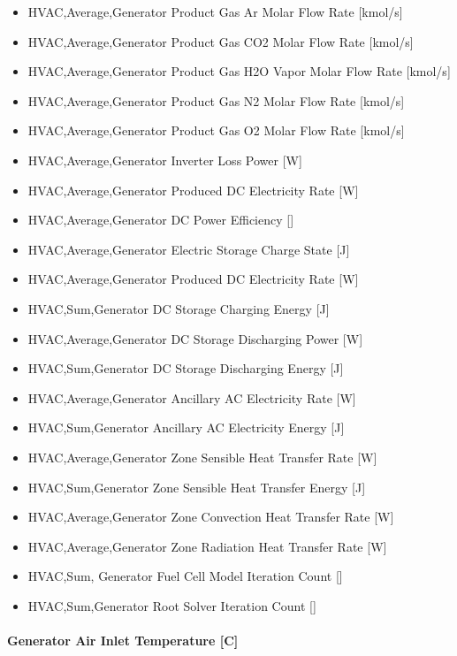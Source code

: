 \begin{itemize}
\item
  HVAC,Average,Generator Product Gas Ar Molar Flow Rate {[}kmol/s{]}
\item
  HVAC,Average,Generator Product Gas CO2 Molar Flow Rate {[}kmol/s{]}
\item
  HVAC,Average,Generator Product Gas H2O Vapor Molar Flow Rate {[}kmol/s{]}
\item
  HVAC,Average,Generator Product Gas N2 Molar Flow Rate {[}kmol/s{]}
\item
  HVAC,Average,Generator Product Gas O2 Molar Flow Rate {[}kmol/s{]}
\item
  HVAC,Average,Generator Inverter Loss Power {[}W{]}
\item
  HVAC,Average,Generator Produced DC Electricity Rate {[}W{]}
\item
  HVAC,Average,Generator DC Power Efficiency {[]}
\item
  HVAC,Average,Generator Electric Storage Charge State {[}J{]}
\item
  HVAC,Average,Generator Produced DC Electricity Rate {[}W{]}
\item
  HVAC,Sum,Generator DC Storage Charging Energy {[}J{]}
\item
  HVAC,Average,Generator DC Storage Discharging Power {[}W{]}
\item
  HVAC,Sum,Generator DC Storage Discharging Energy {[}J{]}
\item
  HVAC,Average,Generator Ancillary AC Electricity Rate {[}W{]}
\item
  HVAC,Sum,Generator Ancillary AC Electricity Energy {[}J{]}
\item
  HVAC,Average,Generator Zone Sensible Heat Transfer Rate {[}W{]}
\item
  HVAC,Sum,Generator Zone Sensible Heat Transfer Energy {[}J{]}
\item
  HVAC,Average,Generator Zone Convection Heat Transfer Rate {[}W{]}
\item
  HVAC,Average,Generator Zone Radiation Heat Transfer Rate {[}W{]}
\item
  HVAC,Sum, Generator Fuel Cell Model Iteration Count {[]}
\item
  HVAC,Sum,Generator Root Solver Iteration Count {[]}
\end{itemize}

\paragraph{Generator Air Inlet Temperature {[}C{]}}\label{generator-air-inlet-temperature-c}

